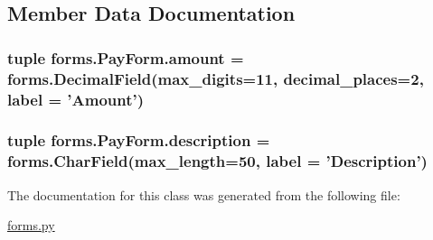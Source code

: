 \subsection{Member Data Documentation}
\hypertarget{classforms_1_1_pay_form_a5d1483bf91d02813dc5e452d98beb013}{
\subsubsection[{amount}]{\setlength{\rightskip}{0pt plus 5cm}tuple forms.\-Pay\-Form.\-amount = forms.\-Decimal\-Field(max\-\_\-digits=11, decimal\-\_\-places=2, label = 'Amount')\hspace{0.3cm}{\ttfamily [static]}}}\label{classforms_1_1_pay_form_a5d1483bf91d02813dc5e452d98beb013}
\hypertarget{classforms_1_1_pay_form_a39a3a28d0b444a5e47b103b7fe36c476}{
\subsubsection[{description}]{\setlength{\rightskip}{0pt plus 5cm}tuple forms.\-Pay\-Form.\-description = forms.\-Char\-Field(max\-\_\-length=50, label = 'Description')\hspace{0.3cm}{\ttfamily [static]}}}\label{classforms_1_1_pay_form_a39a3a28d0b444a5e47b103b7fe36c476}


The documentation for this class was generated from the following file\-:\begin{DoxyCompactItemize}
\item 
\hyperlink{forms_8py}{forms.\-py}\end{DoxyCompactItemize}
